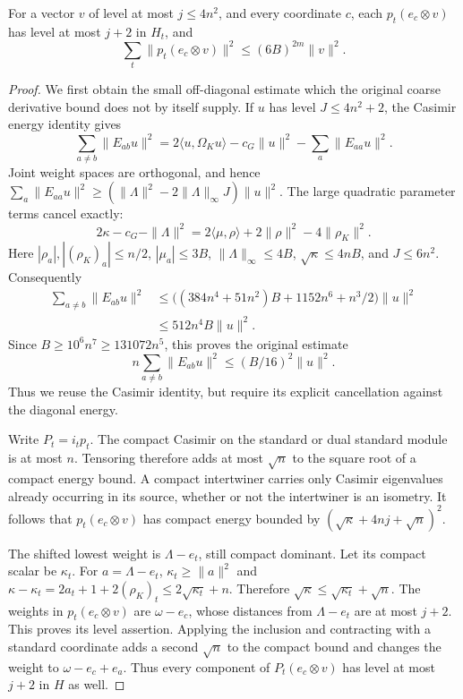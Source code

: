 \begin{theorem}\label{original-tensor-projection-bound}
For a vector $v$ of level at most $j\le4n^2$, and every coordinate $c$,
each $p_t(e_c\otimes v)$ has level at most $j+2$ in $H_t$, and
\[
             \sum_t\|p_t(e_c\otimes v)\|^2
                              \le(6B)^{2m}\|v\|^2.
\]
\end{theorem}

\begin{proof}
We first obtain the small off-diagonal estimate which the original
coarse derivative bound does not by itself supply.  If $u$ has level
$J\le4n^2+2$, the Casimir energy identity gives
\[
 \sum_{a\ne b}\|E_{ab}u\|^2
   =2\langle u,\Omega_Ku\rangle-c_G\|u\|^2
                                      -\sum_a\|E_{aa}u\|^2.
\]
Joint weight spaces are orthogonal, and hence
$\sum_a\|E_{aa}u\|^2
\ge(\|\Lambda\|^2-2\|\Lambda\|_\infty J)\|u\|^2$.
The large quadratic parameter terms cancel exactly:
\begin{equation}\label{tensor-projection-cancellation}
 2\kappa-c_G-\|\Lambda\|^2
              =2\langle\mu,\rho\rangle
                         +2\|\rho\|^2-4\|\rho_K\|^2.
\end{equation}
Here $|\rho_a|,|(\rho_K)_a|\le n/2$, $|\mu_a|\le3B$,
$\|\Lambda\|_\infty\le4B$, $\sqrt\kappa\le4nB$, and
$J\le6n^2$.  Consequently
\[
 \begin{split}
 \sum_{a\ne b}\|E_{ab}u\|^2
 &\le\bigl((384n^4+51n^2)B+1152n^6+n^3/2\bigr)\|u\|^2\\
 &\le512n^4B\|u\|^2.
 \end{split}
\]
Since $B\ge10^6n^7\ge131072n^5$, this proves the original estimate
\begin{equation}\label{tensor-projection-small-offdiagonal}
          n\sum_{a\ne b}\|E_{ab}u\|^2
                                \le(B/16)^2\|u\|^2.
\end{equation}
Thus we reuse the Casimir identity, but require its explicit
cancellation against the diagonal energy.

Write $P_t=i_tp_t$.  The compact Casimir on the standard or dual
standard module is at most $n$.  Tensoring therefore adds at most
$\sqrt n$ to the square root of a compact energy bound.  A compact
intertwiner carries only Casimir eigenvalues already occurring in its
source, whether or not the intertwiner is an isometry.  It follows
that $p_t(e_c\otimes v)$ has compact energy bounded by
$(\sqrt\kappa+4nj+\sqrt n)^2$.

The shifted lowest weight is $\Lambda-e_t$, still compact dominant.
Let its compact scalar be $\kappa_t$.  For $a=\Lambda-e_t$,
$\kappa_t\ge\|a\|^2$ and
$\kappa-\kappa_t=2a_t+1+2(\rho_K)_t
\le2\sqrt{\kappa_t}+n$.
Therefore $\sqrt\kappa\le\sqrt{\kappa_t}+\sqrt n$.
The weights in $p_t(e_c\otimes v)$ are $\omega-e_c$, whose distances
from $\Lambda-e_t$ are at most $j+2$.  This proves its level assertion.
Applying the inclusion and contracting with a standard coordinate
adds a second $\sqrt n$ to the compact bound and changes the weight
to $\omega-e_c+e_a$.  Thus every component of $P_t(e_c\otimes v)$
has level at most $j+2$ in $H$ as well.


\end{proof}
